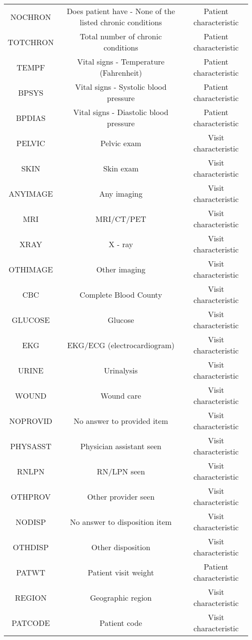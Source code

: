 \documentclass[11pt]{SelfArxOneColBMN}
\begin{document}
\begin{table*}[t]
\begin{tabular}{|c|c|c|}
    NOCHRON & Does patient have - None of the listed chronic conditions & Patient characteristic\\
    TOTCHRON & Total number of chronic conditions & Patient characteristic\\
    TEMPF & Vital signs - Temperature (Fahrenheit) & Patient characteristic\\
    BPSYS & Vital signs - Systolic blood pressure & Patient characteristic\\
    BPDIAS & Vital signs - Diastolic blood pressure & Patient characteristic\\
    PELVIC & Pelvic exam & Visit characteristic\\
    SKIN & Skin exam & Visit characteristic\\
    ANYIMAGE & Any imaging & Visit characteristic\\
    MRI & MRI/CT/PET & Visit characteristic\\
    XRAY & X - ray & Visit characteristic\\
    OTHIMAGE & Other imaging & Visit characteristic\\
    CBC & Complete Blood County & Visit characteristic\\
    GLUCOSE & Glucose & Visit characteristic\\
    EKG & EKG/ECG (electrocardiogram) & Visit characteristic\\
    URINE & Urinalysis & Visit characteristic\\
    WOUND & Wound care & Visit characteristic\\
    NOPROVID & No answer to provided item & Visit characteristic\\
    PHYSASST & Physician assistant seen & Visit characteristic\\
    RNLPN & RN/LPN seen & Visit characteristic\\
    OTHPROV & Other provider seen & Visit characteristic\\
    NODISP & No answer to disposition item & Visit characteristic\\
    OTHDISP & Other disposition & Visit characteristic\\
    PATWT & Patient visit weight & Patient characteristic\\
    REGION & Geographic region & Visit characteristic\\
    PATCODE & Patient code & Visit characteristic\\

\end{tabular}
\end{table*}
\end{document}
